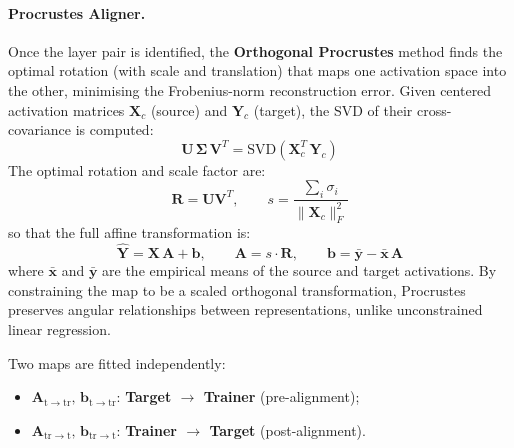 \paragraph{Procrustes Aligner.}
Once the layer pair is identified, the \textbf{Orthogonal Procrustes} method finds the optimal rotation (with scale and translation) that maps one activation space into the other, minimising the Frobenius-norm reconstruction error. Given centered activation matrices $\mathbf{X}_c$ (source) and $\mathbf{Y}_c$ (target), the SVD of their cross-covariance is computed:
\begin{equation}
\label{eq:procrustes_xm_svd}
\mathbf{U}\,\boldsymbol{\Sigma}\,\mathbf{V}^T = \mathrm{SVD}\!\left(\mathbf{X}_c^T\, \mathbf{Y}_c\right)
\end{equation}
The optimal rotation and scale factor are:
\begin{equation}
\label{eq:procrustes_xm_rot}
\mathbf{R} = \mathbf{U}\mathbf{V}^T, \qquad
s = \frac{\sum_i \sigma_i}{\|\mathbf{X}_c\|_F^2}
\end{equation}
so that the full affine transformation is:
\begin{equation}
\label{eq:procrustes_xm_affine}
\hat{\mathbf{Y}} = \mathbf{X}\,\mathbf{A} + \mathbf{b}, \qquad \mathbf{A} = s\cdot\mathbf{R}, \qquad \mathbf{b} = \bar{\mathbf{y}} - \bar{\mathbf{x}}\,\mathbf{A}
\end{equation}
where $\bar{\mathbf{x}}$ and $\bar{\mathbf{y}}$ are the empirical means of the source and target activations. By constraining the map to be a scaled orthogonal transformation, Procrustes preserves angular relationships between representations, unlike unconstrained linear regression.

Two maps are fitted independently:
\begin{itemize}
    \item $\mathbf{A}_{\mathrm{t \to tr}},\, \mathbf{b}_{\mathrm{t \to tr}}$: \textbf{Target $\to$ Trainer} (pre-alignment);
    \item $\mathbf{A}_{\mathrm{tr \to t}},\, \mathbf{b}_{\mathrm{tr \to t}}$: \textbf{Trainer $\to$ Target} (post-alignment).
\end{itemize}

